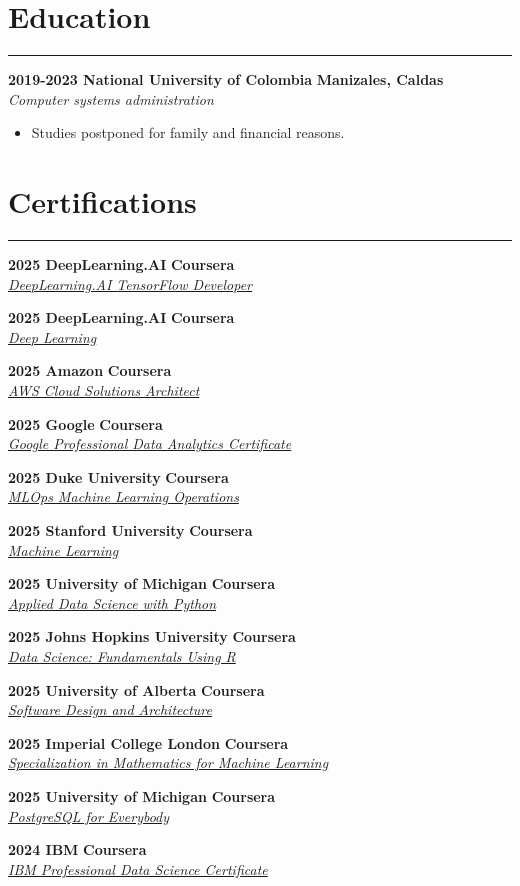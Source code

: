 \documentclass[9pt,a4paper]{article}
\newcommand{\cvevent}[4]{%
  {\noindent \textbf{#1 #2} \hfill \textbf{#3}\\%
   \textit{#4}\\[0pt]}%
}
\begin{document}
\section*{Education}
\vspace{-\baselineskip}
\noindent\rule{\linewidth}{0.5pt}

\cvevent{2019-2023}{National University of Colombia}{Manizales, Caldas}{Computer systems administration}
\vspace{-\baselineskip}
\begin{itemize}[noitemsep, topsep=0pt]
    \item Studies postponed for family and financial reasons.
\end{itemize}
\vspace{-\baselineskip}
\section*{Certifications}
\vspace{-\baselineskip}
\noindent\rule{\linewidth}{0.5pt}
\cvevent{2025}{DeepLearning.AI}{Coursera}{\href{https://www.coursera.org/account/accomplishments/specialization/83F9FK5OOPHM}{DeepLearning.AI TensorFlow Developer}}
\cvevent{2025}{DeepLearning.AI}{Coursera}{\href{https://www.coursera.org/account/accomplishments/specialization/1AZLWBHUEUP5}{Deep Learning}}
\cvevent{2025}{Amazon}{Coursera}{\href{https://www.coursera.org/account/accomplishments/specialization/DQ62CP3GJECK}{AWS Cloud Solutions Architect}}
\cvevent{2025}{Google}{Coursera}{\href{https://www.coursera.org/account/accomplishments/professional-cert/M8V0QULMQX4N}{Google Professional Data Analytics Certificate}}
\cvevent{2025}{Duke University}{Coursera}{\href{https://www.coursera.org/account/accomplishments/specialization/9GW0O26FOENS}{MLOps \textbar{} Machine Learning Operations}}
\cvevent{2025}{Stanford University}{Coursera}{\href{https://www.coursera.org/account/accomplishments/specialization/AC7NFFS0WXWP}{Machine Learning}}
\cvevent{2025}{University of Michigan}{Coursera}{\href{https://www.coursera.org/account/accomplishments/specialization/YVQ1D5MLFDQU}{Applied Data Science with Python}}
\cvevent{2025}{Johns Hopkins University}{Coursera}{\href{https://www.coursera.org/account/accomplishments/specialization/MI5FUPDVP8JW}{Data Science: Fundamentals Using R}}
\cvevent{2025}{University of Alberta}{Coursera}{\href{https://www.coursera.org/account/accomplishments/specialization/PMJQNHZRUFV0}{Software Design and Architecture}}
\cvevent{2025}{Imperial College London}{Coursera}{\href{https://www.coursera.org/account/accomplishments/specialization/D7GUABT9DHUU}{Specialization in Mathematics for Machine Learning}}
\cvevent{2025}{University of Michigan}{Coursera}{\href{https://www.coursera.org/account/accomplishments/specialization/8KBK5UWK2HFK}{PostgreSQL for Everybody}}
\cvevent{2024}{IBM}{Coursera}{\href{https://www.credly.com/badges/eeb6412f-cdff-4324-8399-8e6ca143ef9b}{IBM Professional Data Science Certificate}}
\vspace{-\baselineskip}
\vspace{-\baselineskip}
\end{document}
